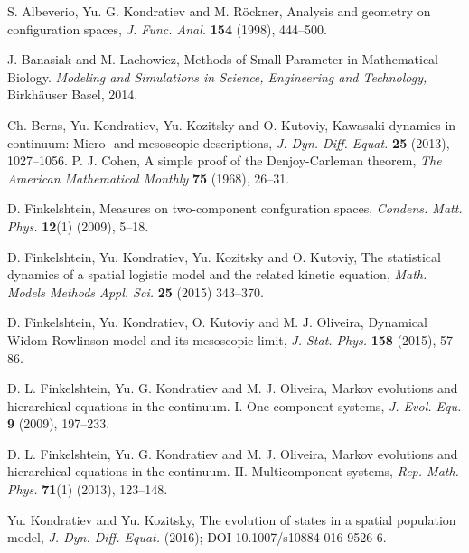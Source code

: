 \documentclass[reqno,11pt]{amsart}
\theoremstyle{definition}
\theoremstyle{remark}
\numberwithin{equation}{section}
\begin{document}
\begin{thebibliography}{ll}

 \newblock S. Albeverio, Yu. G. Kondratiev and M. R\"ockner,
\newblock Analysis and geometry on configuration spaces, \newblock \emph{  J. Func. Anal.} {\bf
154} (1998),  444--500.

 J. Banasiak and M. Lachowicz, Methods of Small Parameter in Mathematical
Biology. \emph{Modeling and Simulations in Science, Engineering and
Technology,} Birkh\"auser Basel, 2014.

 \newblock Ch. Berns,  Yu. Kondratiev, Yu. Kozitsky and O. Kutoviy,
\newblock Kawasaki dynamics in continuum: Micro- and mesoscopic
descriptions, \newblock \emph{ J. Dyn. Diff. Equat.} {\bf 25}
(2013), 1027--1056.
 \newblock  P. J. Cohen, \newblock A simple proof of the
Denjoy-Carleman theorem, \newblock \emph{The American Mathematical
Monthly} {\bf 75} (1968), 26--31.

 \newblock D. Finkelshtein, \newblock  Measures on two-component confguration
spaces, \newblock \emph{Condens. Matt. Phys.} {\bf 12}(1) (2009),
5--18.

 \newblock D. Finkelshtein, Yu. Kondratiev, Yu. Kozitsky and O. Kutoviy, \newblock
The statistical dynamics of a spatial logistic model and the related
kinetic equation, \newblock \emph{Math. Models Methods Appl. Sci.}
{\bf 25} (2015) 343--370.

 \newblock D. Finkelshtein, Yu. Kondratiev, O. Kutoviy and  M. J. Oliveira, \newblock Dynamical Widom-Rowlinson
 model and its mesoscopic limit, \newblock \emph{ J. Stat. Phys. } {\bf 158} (2015),
 57--86.

 \newblock D. L. Finkelshtein,  Yu. G.   Kondratiev and M. J. Oliveira,
\newblock  Markov evolutions and hierarchical equations in the continuum. I.
One-component systems, \newblock \emph{ J. Evol. Equ.} {\bf 9}
(2009), 197--233.

 \newblock D. L. Finkelshtein,  Yu. G.   Kondratiev and M. J. Oliveira,
\newblock Markov evolutions and hierarchical equations in the
continuum. II. Multicomponent systems, \newblock \emph{ Rep. Math.
Phys.} {\bf 71}(1) (2013), 123--148.

 \newblock Yu.  Kondratiev and Yu.  Kozitsky, \newblock
The evolution of states in a spatial population model, \newblock
\emph{J. Dyn. Diff. Equat.} (2016); DOI 10.1007/s10884-016-9526-6.


\end{thebibliography}
\end{document}

